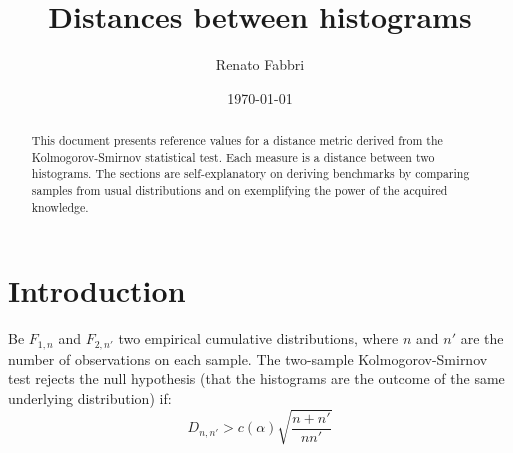 \documentclass[%
	aip,
	jmp,%
	amsmath,amssymb,
	reprint,%
]{revtex4-1}
\begin{document}

\title[Distance between histograms]{Distances between histograms}%
\author{Renato Fabbri}%

\date{\today}%

\begin{abstract}
This document presents reference values for a distance metric
derived from the Kolmogorov-Smirnov statistical test.
Each measure is a distance between two histograms.
The sections are self-explanatory
on deriving benchmarks by comparing samples from usual distributions
and on exemplifying the power of the acquired knowledge.
\end{abstract}

\maketitle
\section{Introduction}\label{sec:intro}
Be $F_{1,n}$ and $F_{2,n'}$ two empirical cumulative distributions,
where $n$ and $n'$ are the number of observations on each sample.
The two-sample Kolmogorov-Smirnov test rejects the null hypothesis
(that the histograms are the outcome of the same underlying distribution)
if:
\begin{equation}\label{eq:ks}
D_{n,n'} > c(\alpha)\sqrt{\frac{n+n'}{nn'}}
\end{equation}
\end{document}
